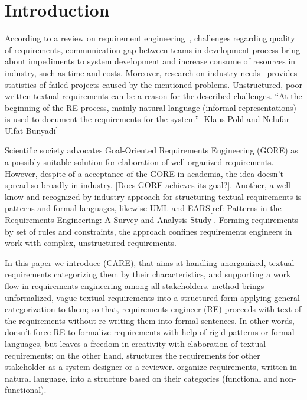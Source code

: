 \section{Introduction}
\label{sec:intro} 


According to a review on requirement engineering~\cite{1Review}, challenges regarding quality of requirements, communication gap between teams in development process bring about impediments to system development and increase consume of resources in industry, such as time and costs. Moreover, research on industry needs~\cite{16NaPiRe} provides statistics of failed projects caused by the mentioned problems. Unstructured, poor written textual requirements can be a reason for the described challenges. 
``At the beginning of the RE process, mainly natural language (informal representations) is used to document the requirements for the system'' [Klaus Pohl and Nelufar Ulfat-Bunyadi]

Scientific society advocates Goal-Oriented Requirements Engineering (GORE) as a possibly suitable solution for elaboration of well-organized requirements. However, despite of a acceptance of the GORE in academia, the idea doesn't spread so broadly in industry. [Does GORE achieves its goal?]. Another, a well-know and recognized by industry approach for structuring textual requirements is patterns and formal languages, likewise UML and EARS[ref: Patterns in the Requirements Engineering: A Survey and Analysis Study]. Forming requirements by set of rules and constraints, the approach confines requirements engineers in work with complex, unstructured requirements.

In this paper we introduce \care (CARE), that aims at handling unorganized, textual requirements categorizing them by their characteristics, and supporting a work flow in requirements engineering among all stakeholders. \ca method brings unformalized, vague textual requirements into 
a structured form applying general categorization to them; so that, requirements engineer (RE) 
proceeds with text of the requirements without re-writing them into formal sentences. 
In other words, \ca doesn't force RE to formalize requirements with help of rigid patterns or 
formal languages, but leaves a freedom in creativity with elaboration of textual requirements; 
on the other hand, \ca structures the requirements for other stakeholder as a system designer or a reviewer.
\ca organize requirements, written in natural language, into a structure based on their categories (functional and non-functional).

